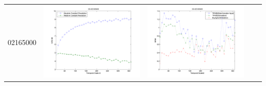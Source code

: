 \documentclass[11pt]{article}
\begin{document}
\begin{table}[H]
{\begin{tabular}{c  c   c   c  c }
02165000&\begin{minipage}{.4\textwidth}\includegraphics[width=\linewidth]{resultgraph/02165000e.png}\end{minipage}
&\begin{minipage}{.4\textwidth}\includegraphics[width=\linewidth]{resultgraph/02165000MI.png}\end{minipage}

\end{tabular}}
\end{table}
\end{document}
